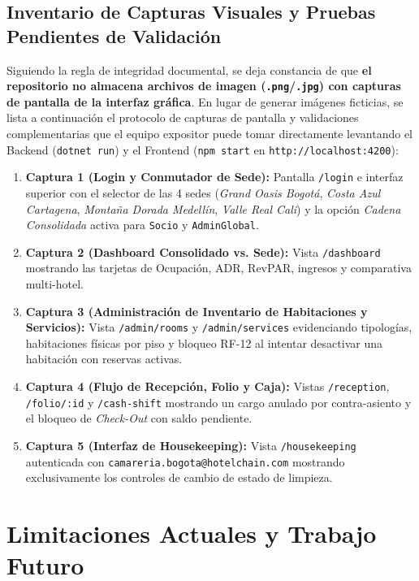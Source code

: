 \documentclass[12pt,a4paper]{article}
\begin{document}
\subsection{Inventario de Capturas Visuales y Pruebas Pendientes de Validaci\'on}
Siguiendo la regla de integridad documental, se deja constancia de que \textbf{el repositorio no almacena archivos de imagen (\texttt{.png}/\texttt{.jpg}) con capturas de pantalla de la interfaz gr\'afica}. En lugar de generar im\'agenes ficticias, se lista a continuaci\'on el protocolo de capturas de pantalla y validaciones complementarias que el equipo expositor puede tomar directamente levantando el Backend (\texttt{dotnet run}) y el Frontend (\texttt{npm start} en \texttt{http://localhost:4200}):
\begin{enumerate}
    \item \textbf{Captura 1 (Login y Conmutador de Sede):} Pantalla \texttt{/login} e interfaz superior con el selector de las 4 sedes (\textit{Grand Oasis Bogot\'a}, \textit{Costa Azul Cartagena}, \textit{Monta\~na Dorada Medell\'in}, \textit{Valle Real Cali}) y la opci\'on \textit{Cadena Consolidada} activa para \texttt{Socio} y \texttt{AdminGlobal}.
    \item \textbf{Captura 2 (Dashboard Consolidado vs. Sede):} Vista \texttt{/dashboard} mostrando las tarjetas de Ocupaci\'on, ADR, RevPAR, ingresos y comparativa multi-hotel.
    \item \textbf{Captura 3 (Administraci\'on de Inventario de Habitaciones y Servicios):} Vista \texttt{/admin/rooms} y \texttt{/admin/services} evidenciando tipolog\'ias, habitaciones f\'isicas por piso y bloqueo RF-12 al intentar desactivar una habitaci\'on con reservas activas.
    \item \textbf{Captura 4 (Flujo de Recepci\'on, Folio y Caja):} Vistas \texttt{/reception}, \texttt{/folio/:id} y \texttt{/cash-shift} mostrando un cargo anulado por contra-asiento y el bloqueo de \textit{Check-Out} con saldo pendiente.
    \item \textbf{Captura 5 (Interfaz de Housekeeping):} Vista \texttt{/housekeeping} autenticada con \texttt{camareria.bogota@hotelchain.com} mostrando exclusivamente los controles de cambio de estado de limpieza.
\end{enumerate}

\section{Limitaciones Actuales y Trabajo Futuro}
\end{document}
